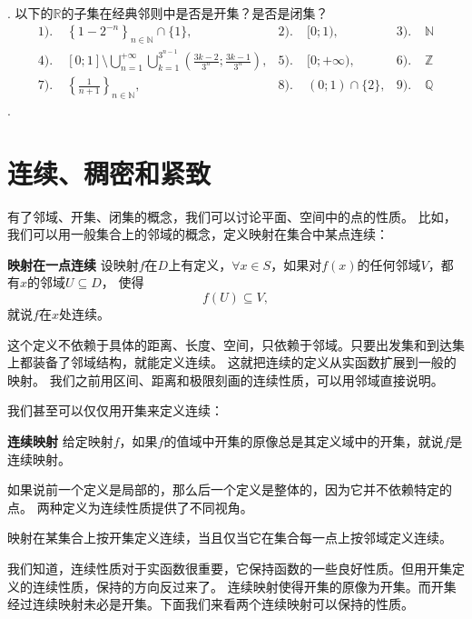 \documentclass[12pt,UTF8]{ctexbook}
\begin{document}
\begin{sk}
    \mbox{} \\
    . 以下的$\mathbb{R}$的子集在经典邻则中是否是开集？是否是闭集？\\
    \begin{align*}
        1).& \;\left\{1 - 2^{-n}\right\}_{n\in\mathbb{N}}\cap\{1\},  &2).& \;[0;1),  &3).& \;\mathbb{N} \\
        4).& \; [0;1]\setminus \bigcup_{n=1}^{+\infty} \bigcup_{k=1}^{3^{n-1}} \left(\frac{3k - 2}{3^n};\frac{3k - 1}{3^n}\right),  &5).& \;[0;+\infty), &6).& \;\mathbb{Z} \\
        7).& \;\left\{\frac{1}{n+1}\right\}_{n\in\mathbb{N}},  &8).& \;(0;1)\cap\{2\}, &9).& \; \mathbb{Q}
    \end{align*}
    . 
\end{sk}

\section{连续、稠密和紧致}

有了邻域、开集、闭集的概念，我们可以讨论平面、空间中的点的性质。
比如，我们可以用一般集合上的邻域的概念，定义映射在集合中某点连续：
\begin{df}{\textbf{映射在一点连续}}
    设映射$f$在$D$上有定义，$\forall x\in S$，如果对$f(x)$的任何邻域$V$，都有$x$的邻域$U\subseteq D$，
    使得
    $$ f(U) \subseteq V,$$
    就说$f$在$x$处连续。
\end{df}
这个定义不依赖于具体的距离、长度、空间，只依赖于邻域。只要出发集和到达集上都装备了邻域结构，就能定义连续。
这就把连续的定义从实函数扩展到一般的映射。
我们之前用区间、距离和极限刻画的连续性质，可以用邻域直接说明。

我们甚至可以仅仅用开集来定义连续：
\begin{df}{\textbf{连续映射}}
    给定映射$f$，如果$f$的值域中开集的原像总是其定义域中的开集，就说$f$是连续映射。
\end{df}

如果说前一个定义是局部的，那么后一个定义是整体的，因为它并不依赖特定的点。
两种定义为连续性质提供了不同视角。

映射在某集合上按开集定义连续，当且仅当它在集合每一点上按邻域定义连续。

我们知道，连续性质对于实函数很重要，它保持函数的一些良好性质。但用开集定义的连续性质，保持的方向反过来了。
连续映射使得开集的原像为开集。而开集经过连续映射未必是开集。下面我们来看两个连续映射可以保持的性质。
\end{document}
